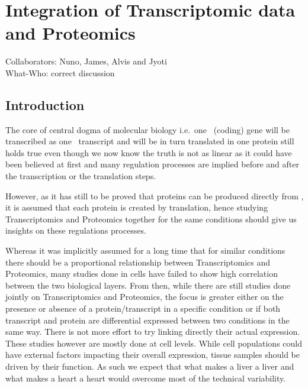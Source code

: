 \clearpage
\chapter{Integration of Transcriptomic data and Proteomics}

Collaborators: Nuno, James, Alvis and Jyoti\\
What-Who: correct discussion

\section{Introduction}

\begin{comment}
    here should be explain all the reasons and the challenging of why this is important
    Here some of the reasons: Transcriptomics and Proteomics are not the same range (technology bias)
    It is hard to say when it is NOT correlated if this comes from a technical problem or regulation.

    Workflows a lot better established in transcriptomics than Proteomics (annotation, mapping)

\end{comment}

The core of central dogma of molecular biology i.e.\ one \DNA\ (coding) gene will
be transcribed as one \mRNA\ transcript and will be in turn translated in one
protein still holds true even though we now know the truth is not as linear as it
could have been believed at first and many regulation processes are implied before
and after the transcription or the translation steps.

However, as it has still to be proved that proteins can be produced directly
from \DNA, it is assumed that each protein is created by translation, hence studying
Transcriptomics and Proteomics together for the same conditions should give us
insights on these regulations processes.

Whereas it was implicitly assumed for a long time that for similar conditions
there should be a proportional relationship between Transcriptomics and Proteomics,
many studies  done in cells have
failed to show high correlation between the two biological layers.
From then, while there are still studies done jointly on Transcriptomics and
Proteomics, the focus is greater either on the presence or absence of a
protein/transcript in a specific condition or if both transcript and protein
are differential expressed between two conditions in the same way.
There is not more
effort to try linking directly their actual expression.
These studies however are mostly done at cell levels.
While cell populations could have external factors impacting their overall
expression, tissue samples should be driven by their function.
As such we expect that what makes a liver a liver and what makes a heart a heart
would overcome most of the technical variability.


